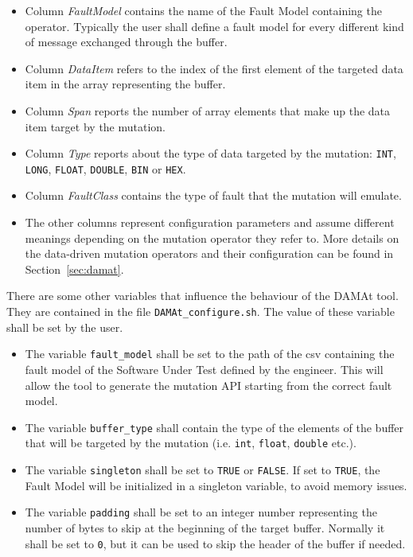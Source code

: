 \begin{itemize}
  \item Column \emph{FaultModel} contains the name of the Fault Model containing the operator. Typically the user shall define a fault model for every different kind of message exchanged through the buffer.

  \item Column \emph{DataItem} refers to the index of the first element of the targeted data item in the array representing the buffer.

  \item Column \emph{Span} reports the number of array elements that make up the data item target by the mutation.

  \item Column \emph{Type} reports about the type of data targeted by the mutation: \texttt{INT}, \texttt{LONG}, \texttt{FLOAT}, \texttt{DOUBLE}, \texttt{BIN} or \texttt{HEX}.

  \item Column \emph{FaultClass} contains the type of fault that the mutation will emulate.

  \item The other columns represent configuration parameters and assume different meanings depending on the mutation operator they refer to. More details on the data-driven mutation operators and their configuration can be found in Section~\ref{sec:damat}.
\end{itemize}

There are some other variables that influence the behaviour of the DAMAt tool.
They are contained in the file \texttt{DAMAt\_configure.sh}. The value of these variable shall be set by the user.

\begin{itemize}
  \item The variable \texttt{fault\_model} shall be set to the path of the csv containing the fault model of the Software Under Test defined by the engineer.
  This will allow the tool to generate the mutation API starting from the correct fault model.
  \item The variable \texttt{buffer\_type} shall contain the type of the elements of the buffer that will be targeted by the mutation (i.e. \texttt{int}, \texttt{float}, \texttt{double} etc.).
  \item The variable \texttt{singleton} shall be set to \texttt{TRUE} or \texttt{FALSE}. If set to \texttt{TRUE}, the Fault Model will be initialized in a singleton variable, to avoid memory issues.
  \item The variable \texttt{padding} shall be set to an integer number representing the number of bytes to skip at the beginning of the target buffer. Normally it shall be set to \texttt{0}, but it can be used to skip the header of the buffer if needed.
\end{itemize}

